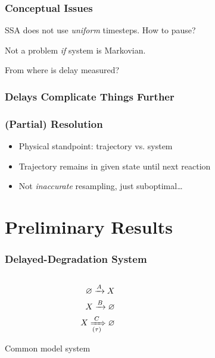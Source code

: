 \documentclass[xcolor={usenames,dvipsnames,svgnames}]{beamer}
\begin{document}
\begin{frame}
    \frametitle{Conceptual Issues}
    SSA does not use \emph{uniform} timesteps. How to pause?

    \begin{center}
        
    \end{center}

    Not a problem \emph{if} system is Markovian.
\end{frame}

\begin{frame}
    From where is delay measured?

    \frametitle{Delays Complicate Things Further}
    \begin{center}
        
    \end{center}
\end{frame}

\begin{frame}
    \frametitle{(Partial) Resolution}
    \begin{itemize}
        \item Physical standpoint: trajectory vs. system
        \item Trajectory remains in given state until next reaction
        \item Not \emph{inaccurate} resampling, just suboptimal\ldots
    \end{itemize}
\end{frame}


\section{Preliminary Results}

\begin{frame}
    \frametitle{Delayed-Degradation System}
    \begin{columns}[c]
        \begin{column}{0.5\textwidth}
            \begin{align*}
                \varnothing \xrightarrow{A} X \\
                X \xrightarrow{B} \varnothing \\
                X \xRightarrow[(\tau)]{C} \varnothing
            \end{align*}

            Common model system
        \end{column}
        \begin{column}{0.5\textwidth}
            \begin{center}
                \resizebox{\textwidth}{!}{
                    
                }
            \end{center}
        \end{column}
    \end{columns}
\end{frame}
\end{document}
